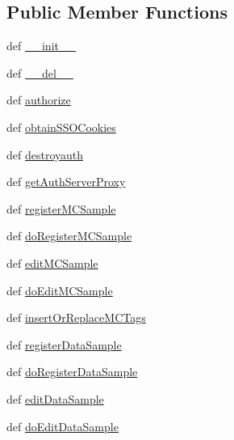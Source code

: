 \subsection*{Public Member Functions}
\begin{DoxyCompactItemize}
\item 
def \hyperlink{classaix3adb__deprecated_1_1aix3adbAuth_adcd374379eb20162473ce81760b9466f}{\-\_\-\-\_\-init\-\_\-\-\_\-}
\item 
def \hyperlink{classaix3adb__deprecated_1_1aix3adbAuth_a717b6b75cc5df38be9e9baadbd0efff5}{\-\_\-\-\_\-del\-\_\-\-\_\-}
\item 
def \hyperlink{classaix3adb__deprecated_1_1aix3adb_a490404ee7dfb72ba4884f2e3c060c10b}{authorize}
\item 
def \hyperlink{classaix3adb__deprecated_1_1aix3adb_a7d8886f97e6d6e390911b11f22189857}{obtain\-S\-S\-O\-Cookies}
\item 
def \hyperlink{classaix3adb__deprecated_1_1aix3adb_ade9b8034afdc23c640a64044a8c5028a}{destroyauth}
\item 
def \hyperlink{classaix3adb__deprecated_1_1aix3adb_a5561564b7bc878c3931757a86fc998c0}{get\-Auth\-Server\-Proxy}
\item 
def \hyperlink{classaix3adb__deprecated_1_1aix3adb_ad7871bd3d0b94d112e6a1a4422d4b877}{register\-M\-C\-Sample}
\item 
def \hyperlink{classaix3adb__deprecated_1_1aix3adb_a08a3fca51e520becce3ca68603959f0e}{do\-Register\-M\-C\-Sample}
\item 
def \hyperlink{classaix3adb__deprecated_1_1aix3adb_a490cbf5a8c97a75bff960e091efeb8e8}{edit\-M\-C\-Sample}
\item 
def \hyperlink{classaix3adb__deprecated_1_1aix3adb_ac88f8e3cf660a52ba67b179722a25f57}{do\-Edit\-M\-C\-Sample}
\item 
def \hyperlink{classaix3adb__deprecated_1_1aix3adb_a08a6cdde461fc3b6b9e2e188fee268e0}{insert\-Or\-Replace\-M\-C\-Tags}
\item 
def \hyperlink{classaix3adb__deprecated_1_1aix3adb_af21abd684c5b332f11f0d509d804fd40}{register\-Data\-Sample}
\item 
def \hyperlink{classaix3adb__deprecated_1_1aix3adb_a5d5d8818c2df751dabba566f4acdf399}{do\-Register\-Data\-Sample}
\item 
def \hyperlink{classaix3adb__deprecated_1_1aix3adb_ad30dfeecd2d84b0dcd07cb46746a0487}{edit\-Data\-Sample}
\item 
def \hyperlink{classaix3adb__deprecated_1_1aix3adb_abe0b6b9154799b9b7fbbee9a05f611f7}{do\-Edit\-Data\-Sample}

\end{DoxyCompactItemize}
